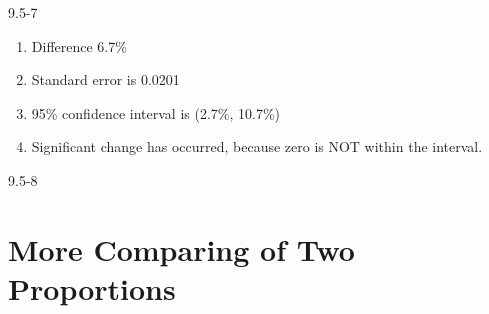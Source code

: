 \begin{exsol@solution}{9.5-7}
\begin{enumerate}
\item Difference 6.7\%

\item Standard error is 0.0201
\item  95\% confidence interval is (2.7\%, 10.7\%)

\item Significant change has occurred, because zero is NOT within the interval.

\end{enumerate}

\end{exsol@solution}
\begin{exsol@solution}{9.5-8}
\end{exsol@solution}
\setcounter{chapter}{9}\chapter{More Comparing of Two Proportions}
